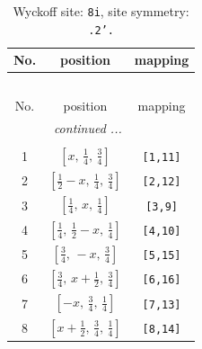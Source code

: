 \documentclass[fleqn,8pt]{jsarticle}
\begin{document}
\renewcommand{\arraystretch}{1.2}
\begin{longtable}{ccc}
\caption{Wyckoff site: {\tt 8i}, site symmetry: {\tt .2'.}}
 \\
 \hline \hline
No. & position & mapping \\ \hline \endfirsthead

\multicolumn{2}{l}{\tablename\ \thetable{}} \\
 \hline \hline
No. & position & mapping \\ \hline \endhead

 \hline \hline
\multicolumn{2}{r}{\footnotesize\it continued ...} \\ \endfoot

 \hline \hline
\multicolumn{2}{r}{} \\ \endlastfoot

1 & $\left[ x,\, \frac{1}{4},\, \frac{3}{4} \right]$ & {\tt [1,11]} \\ \hline
2 & $\left[ \frac{1}{2} - x,\, \frac{1}{4},\, \frac{3}{4} \right]$ & {\tt [2,12]} \\ \hline
3 & $\left[ \frac{1}{4},\, x,\, \frac{1}{4} \right]$ & {\tt [3,9]} \\ \hline
4 & $\left[ \frac{1}{4},\, \frac{1}{2} - x,\, \frac{1}{4} \right]$ & {\tt [4,10]} \\ \hline
5 & $\left[ \frac{3}{4},\, - x,\, \frac{3}{4} \right]$ & {\tt [5,15]} \\ \hline
6 & $\left[ \frac{3}{4},\, x + \frac{1}{2},\, \frac{3}{4} \right]$ & {\tt [6,16]} \\ \hline
7 & $\left[ - x,\, \frac{3}{4},\, \frac{1}{4} \right]$ & {\tt [7,13]} \\ \hline
8 & $\left[ x + \frac{1}{2},\, \frac{3}{4},\, \frac{1}{4} \right]$ & {\tt [8,14]} \\
\end{longtable}
\renewcommand{\arraystretch}{1.2}
\end{document}

